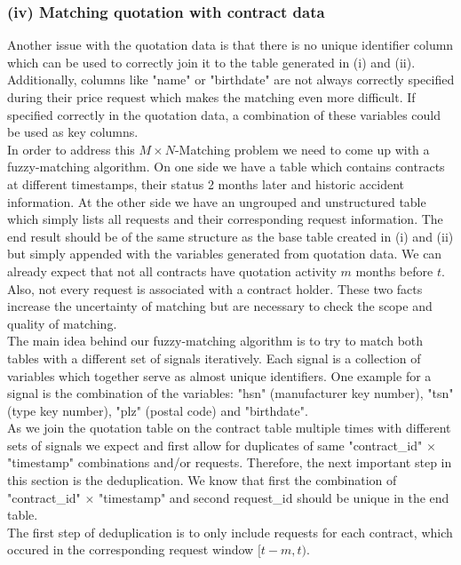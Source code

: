 \documentclass[12pt,titlepage]{article}
\begin{document}
\subsubsection*{(iv) Matching quotation with contract data}
Another issue with the quotation data is that there is no unique identifier column which can be used to correctly join it to the table generated in (i) and (ii). Additionally, columns like "name" or "birthdate" are not always correctly specified during their price request which makes the matching even more difficult. If specified correctly in the quotation data, a combination of these variables could be used as key columns. \\
In order to address this $M\times N$-Matching problem we need to come up with a fuzzy-matching algorithm. On one side we have a table which contains contracts at different timestamps, their status 2 months later and historic accident information. At the other side we have an ungrouped and unstructured table which simply lists all requests and their corresponding request information. The end result should be of the same structure as the base table created in (i) and (ii) but simply appended with the variables generated from quotation data. We can already expect that not all contracts have quotation activity $m$ months before $t$. Also, not every request is associated with a contract holder. These two facts increase the uncertainty of matching but are necessary to check the scope and quality of matching. \\
The main idea behind our fuzzy-matching algorithm is to try to match both tables with a different set of signals iteratively. Each signal is a collection of variables which together serve as almost unique identifiers. One example for a signal is the combination of the variables: "hsn" (manufacturer key number), "tsn" (type key number), "plz" (postal code) and "birthdate". \\
As we join the quotation table on the contract table multiple times with different sets of signals we expect and first allow for duplicates of same "contract\_id" $\times$ "timestamp" combinations and/or requests. Therefore, the next important step in this section is the deduplication. We know that first the combination of "contract\_id" $\times$ "timestamp" and second request\_id should be unique in the end table. \\
The first step of deduplication is to only include requests for each contract, which occured in the corresponding request window $[t-m,t)$. \\
\end{document}
